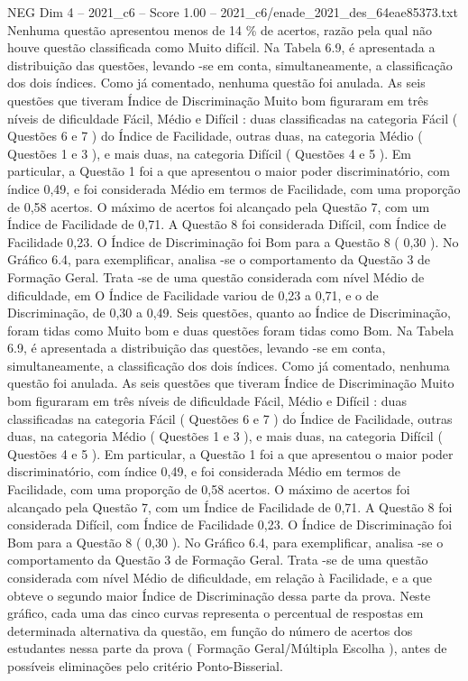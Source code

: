 \begin{textsample}{NEG Dim 4 – 2021\_c6 – Score 1.00 – 2021\_c6/enade\_2021\_des\_64eae85373.txt}
Nenhuma questão apresentou menos de 14 \% de acertos, razão pela qual não houve questão classificada como Muito difícil.
Na Tabela 6.9, é apresentada a distribuição das questões, levando -se em conta, simultaneamente, a classificação dos dois índices.
Como já comentado, nenhuma questão foi anulada.
As seis questões que tiveram Índice de Discriminação Muito bom figuraram em três níveis de dificuldade Fácil, Médio e Difícil : duas classificadas na categoria Fácil ( Questões 6 e 7 ) do Índice de Facilidade, outras duas, na categoria Médio ( Questões 1 e 3 ), e mais duas, na categoria Difícil ( Questões 4 e 5 ).
Em particular, a Questão 1 foi a que apresentou o maior poder discriminatório, com índice 0,49, e foi considerada Médio em termos de Facilidade, com uma proporção de 0,58 acertos.
O máximo de acertos foi alcançado pela Questão 7, com um Índice de Facilidade de 0,71.
A Questão 8 foi considerada Difícil, com Índice de Facilidade 0,23.
O Índice de Discriminação foi Bom para a Questão 8 ( 0,30 ).
No Gráfico 6.4, para exemplificar, analisa -se o comportamento da Questão 3 de Formação Geral.
Trata -se de uma questão considerada com nível Médio de dificuldade, em O Índice de Facilidade variou de 0,23 a 0,71, e o de Discriminação, de 0,30 a 0,49.
Seis questões, quanto ao Índice de Discriminação, foram tidas como Muito bom e duas questões foram tidas como Bom.
Na Tabela 6.9, é apresentada a distribuição das questões, levando -se em conta, simultaneamente, a classificação dos dois índices.
Como já comentado, nenhuma questão foi anulada.
As seis questões que tiveram Índice de Discriminação Muito bom figuraram em três níveis de dificuldade Fácil, Médio e Difícil : duas classificadas na categoria Fácil ( Questões 6 e 7 ) do Índice de Facilidade, outras duas, na categoria Médio ( Questões 1 e 3 ), e mais duas, na categoria Difícil ( Questões 4 e 5 ).
Em particular, a Questão 1 foi a que apresentou o maior poder discriminatório, com índice 0,49, e foi considerada Médio em termos de Facilidade, com uma proporção de 0,58 acertos.
O máximo de acertos foi alcançado pela Questão 7, com um Índice de Facilidade de 0,71.
A Questão 8 foi considerada Difícil, com Índice de Facilidade 0,23.
O Índice de Discriminação foi Bom para a Questão 8 ( 0,30 ).
No Gráfico 6.4, para exemplificar, analisa -se o comportamento da Questão 3 de Formação Geral.
Trata -se de uma questão considerada com nível Médio de dificuldade, em relação à Facilidade, e a que obteve o segundo maior Índice de Discriminação dessa parte da prova.
Neste gráfico, cada uma das cinco curvas representa o percentual de respostas em determinada alternativa da questão, em função do número de acertos dos estudantes nessa parte da prova ( Formação Geral/Múltipla Escolha ), antes de possíveis eliminações pelo critério Ponto-Bisserial.

\end{textsample}
